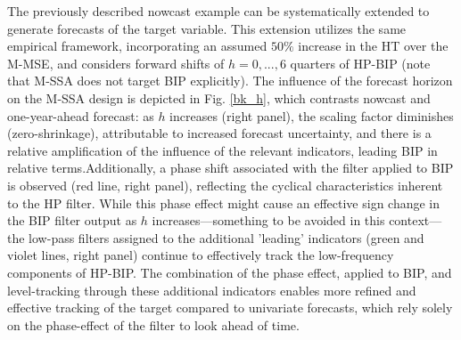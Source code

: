 \documentclass[a4paper]{article}
\begin{document}
The previously described nowcast example can be systematically extended to generate forecasts of the target variable. This extension utilizes the same empirical framework, incorporating an assumed $50\%$ increase in the HT over the M-MSE, and considers forward shifts of $h=0,...,6$  quarters of HP-BIP (note that M-SSA does not target BIP explicitly). %
The influence of the forecast horizon on the M-SSA design is depicted in Fig. \eqref{bk_h}, which contrasts nowcast and one-year-ahead forecast: as $h$ increases (right panel), the scaling factor diminishes (zero-shrinkage), attributable to increased forecast uncertainty, and there is a relative amplification of the influence of the relevant indicators, leading BIP in relative terms.Additionally, a phase shift associated with the filter applied to BIP is observed (red line, right panel), reflecting the cyclical characteristics inherent to the HP filter. While this phase effect might cause an effective sign change in the BIP filter output as $h$ increases—something to be avoided in this context—the low-pass filters assigned to the additional 'leading' indicators (green and violet lines, right panel) continue to effectively track the low-frequency components of HP-BIP. The combination of the phase effect, applied to BIP, and level-tracking through these additional indicators enables more refined and effective tracking of the target compared to univariate forecasts, which rely solely on the phase-effect of the filter to look ahead of time.\\
\end{document}
